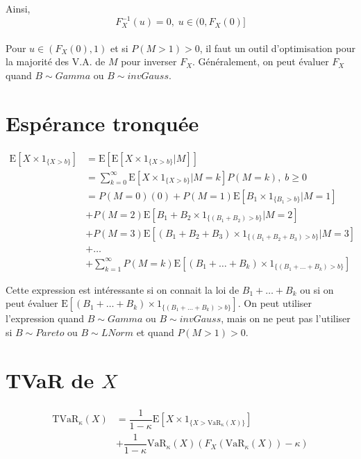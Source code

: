\documentclass[]{book}
\theoremstyle{definition}
\theoremstyle{definition}
\theoremstyle{definition}
\theoremstyle{remark}
\begin{document}
Ainsi, \[
F_X^{-1}(u)=0,\;u\in(0,F_X(0)]
\]\\
Pour \(u\in(F_X(0),1)\) et si \(P(M>1)>0\), il faut un outil
d'optimisation pour la majorité des V.A. de \(M\) pour inverser \(F_X\).
Généralement, on peut évaluer \(F_X\) quand \(B \sim Gamma\) ou
\(B \sim invGauss\).

\section{Espérance tronquée}\label{esperance-tronquee}

\begin{align*}
\text{E}\left [X \times 1_{\{X>b\}}\right ]& =\text{E}\left [\text{E}\left [X \times 1_{\{X>b\}}|M\right ]\right ]\\
& =\sum^\infty_{k=0} \text{E}\left [X \times  1_{\{X>b\}}|M=k\right ]P(M=k),\;b\geq 0\\
& =P(M=0)(0)+P(M=1)\text{E}\left [B_1 \times   1_{\{B_1>b\}}|M=1\right ]\\
& +P(M=2)\text{E}\left [B_1+B_2 \times   1_{\{(B_1+B_2)>b\}}|M=2\right ]\\
& +P(M=3)\text{E}\left [(B_1+B_2+B_3) \times   1_{\{(B_1+B_2+B_3)>b\}}|M=3\right ]\\
&+ \dots\\
&+ \sum^\infty_{k=1} P(M=k) \text{E}\left [(B_1+ \dots +B_k) \times  1_{\{(B_1+\dots+B_k)>b\}}\right ]
\end{align*}

Cette expression est intéressante si on connait la loi de
\(B_1+ \dots +B_k\) ou si on peut évaluer
\(\text{E}\left [(B_1+ \dots +B_k) \times 1_{\{(B_1+\dots+B_k)>b\}}\right ]\).
On peut utiliser l'expression quand \(B \sim Gamma\) ou
\(B \sim invGauss\), mais on ne peut pas l'utiliser si \(B \sim Pareto\)
ou \(B \sim LNorm\) et quand \(P(M>1)>0\).

\section{\texorpdfstring{TVaR de \(X\)}{TVaR de X}}\label{tvar-de-x}

\begin{align*}
\text{TVaR}_\kappa (X)& = \dfrac{1}{1-\kappa}\text{E}\left [X\times 1_{\{X>\text{VaR}_\kappa (X) \}}\right ]\\
& + \dfrac{1}{1-\kappa}\text{VaR}_\kappa (X) \left (F_X(\text{VaR}_\kappa (X) )-\kappa\right )
\end{align*}
\end{document}
